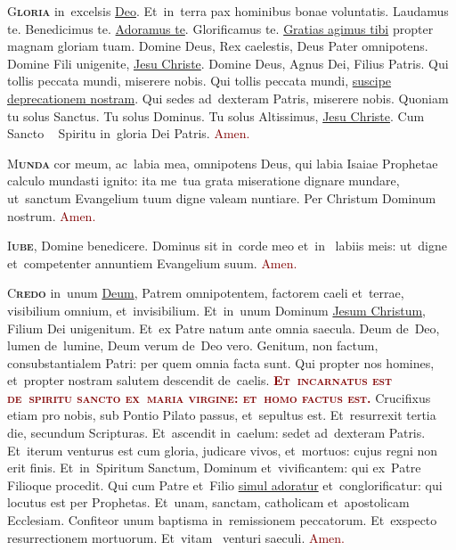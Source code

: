\documentclass[12pt, landscape]{scrartcl}
\newcommand{\krzyz}{\textcolor{red}{\raisebox{-1mm}{\scalebox{1.5}{\ding{64}}}}}
\newcommand{\amen}{\textcolor{Maroon}{Amen.}}
\newcommand{\initial}[2]{\lettrine[lines=3]{\color{Maroon}#1}{\bfseries\color{Maroon}#2}}
\newcommand{\gap}{\vspace{0.65cm}}
\newcommand{\sklon}[1]{\ul{#1}}
\begin{document}
\thispagestyle{empty}

\pagecolor{fondpaille}
\color{darkgreen}
\large

\begin{center}

    \begin{minipage}[t]{0.29\linewidth}

        \vspace*{2.2cm}

        \initial{G}{loria} in~excelsis \sklon{Deo}. Et~in~terra pax hominibus
        bonae voluntatis. Laudamus te. Benedicimus te. \sklon{Adoramus te}.
        Glorificamus te. \sklon{Gratias agimus tibi} propter magnam gloriam
        tuam. Domine Deus, Rex caelestis, Deus Pater omnipotens. Domine Fili
        unigenite, \sklon{Jesu Christe}. Domine Deus, Agnus Dei, Filius Patris.
        Qui tollis peccata mundi, miserere nobis. Qui tollis peccata mundi,
        \sklon{suscipe deprecationem nostram}. Qui sedes ad~dexteram Patris,
        miserere nobis. Quoniam tu solus Sanctus. Tu solus Dominus. Tu solus
        Altissimus, \sklon{Jesu Christe}. Cum Sancto \krzyz~ Spiritu in~gloria
        Dei Patris. \amen

        \gap

        \initial{M}{unda} cor meum, ac~labia mea, omnipotens Deus, qui labia
        Isaiae Prophetae calculo mundasti ignito: ita me~tua grata miseratione
        dignare mundare, ut~sanctum Evangelium tuum digne valeam nuntiare. Per
        Christum Dominum nostrum. \amen

        \gap

        \initial{I}{ube}, Domine benedicere. Dominus sit in~corde meo et~in~
        labiis meis: ut~digne et~competenter annuntiem Evangelium suum. \amen

        \gap

        \initial{C}{redo} in~unum \sklon{Deum}, Patrem omnipotentem, factorem
        caeli et~terrae, visibilium omnium, et~invisibilium. Et~in~unum Dominum
        \sklon{Jesum Christum}, Filium Dei unigenitum. Et~ex Patre natum ante
        omnia saecula. Deum de~Deo, lumen de~lumine, Deum verum de~Deo vero.
        Genitum, non factum, consubstantialem Patri: per quem omnia facta sunt.
        Qui propter nos homines, et~propter nostram salutem descendit de~caelis.
        \textcolor{Maroon}{\bfseries\scshape Et~incarnatus est de~spiritu sancto
        ex~maria virgine: et~homo factus est.} Crucifixus etiam pro nobis, sub
        Pontio Pilato passus, et~sepultus est. Et~resurrexit tertia die,
        secundum Scripturas. Et~ascendit in~caelum: sedet ad~dexteram Patris.
        Et~iterum venturus est cum gloria, judicare vivos, et~mortuos: cujus
        regni non erit finis. Et~in~Spiritum Sanctum, Dominum et~vivificantem:
        qui ex~Patre Filioque procedit. Qui cum Patre et~Filio \sklon{simul
        adoratur} et~conglorificatur: qui locutus est per Prophetas. Et~unam,
        sanctam, catholicam et~apostolicam Ecclesiam. Confiteor unum baptisma
        in~remissionem peccatorum. Et~exspecto resurrectionem mortuorum.
        Et~vitam \krzyz~venturi saeculi.
        \amen


\end{minipage}
\end{center}
\end{document}

